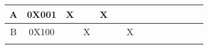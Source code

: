 \documentclass[12pt,a4paper]{report}
\begin{document}
\begin{tabular}{|c|c|c|c|c|c|c|c|c|c|c|c|c|c|}
    \cellcolor[HTML]{FFCCC9}A & \cellcolor[HTML]{FFCCC9}0X001 & X                                                                                 &                                                                                   & X                                                                                 & \cellcolor[HTML]{FFCCC9}                                  &                                                                                   &                                                                                   &                                                                                   &                                                                                   &                                                                                   &                                                                                   &                                                                                   &                                                                                   \\ \hline
    \rowcolor[HTML]{FFFFC7} 
    \cellcolor[HTML]{FFCCC9}B & \cellcolor[HTML]{FFCCC9}0X100 &                                                                                   & X                                                                                 &                                                                                   & \cellcolor[HTML]{FFCCC9}                                  & X                                                                                 &                                                                                   &                                                                                   &                                                                                   &                                                                                   &                                                                                   &                                                                                   &                                                                                   \\ \hline
    \rowcolor[HTML]{FFFFC7} 

\end{tabular}
\end{document}
